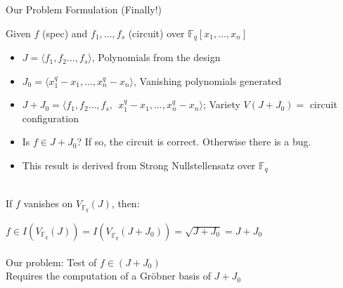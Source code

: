\documentclass[xcolor=dvipsnames]{beamer}
\newcommand{\Fq}{{\mathbb{F}}_{q}}
\begin{document}
\begin{frame}{\large {Our Problem Formulation (Finally!)}}

Given $f$ (spec) and $f_1, \dots, f_s$ (circuit) over
  $\mathbb{F}_q[x_1, \dots, x_n]$
\begin{itemize}
\item $J = \langle f_1, f_2 \ldots, f_s\rangle$, Polynomials from the design
\item $J_0 = \langle x_1^q  - x_1, \dots, x_n^q - x_n\rangle$,
  Vanishing polynomials generated
\item $J + J_0 = \langle f_1, f_2 \ldots, f_s, ~~ x_1^q
  - x_1, \dots, x_n^q - x_n\rangle$;  Variety $V(J + J_0) = $ circuit configuration
\item Is $f \in J + J_0$? If so, the circuit is correct. Otherwise
  there is a bug.
\item This result is derived from \alert{Strong Nullstellensatz} over $\mathbb{F}_q$
\end{itemize}

\ \\



If $f$ vanishes on $V_{\Fq} (J)$, then:\\
\begin{center}
 $f \in I(V_{\Fq}(J)) = I(V_{\overline{\Fq}}(J + J_0)) = \sqrt{J +
   J_0} = J + J_0$\\
\ \\
Our problem: Test of $f \in (J + J_0)$\\

Requires the computation of a \alert{Gr\"obner basis of $J + J_0$}
\end{center}
\end{frame}
\end{document}

